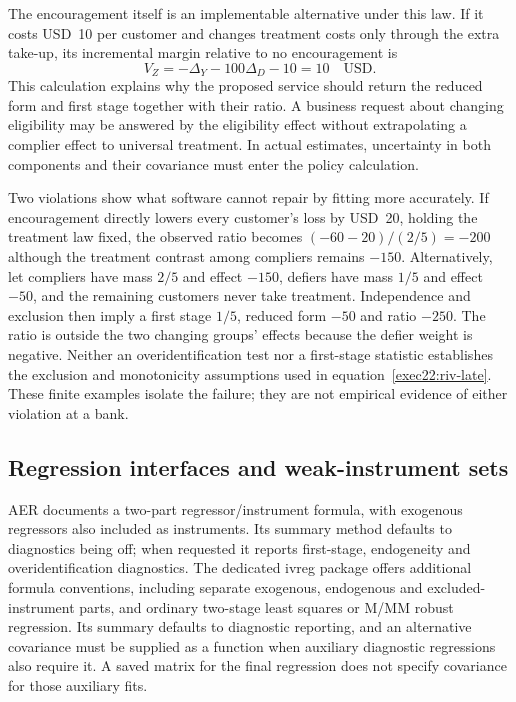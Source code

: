 The encouragement itself is an implementable alternative under this law. If it
costs USD~10 per customer and changes treatment costs only through the extra
take-up, its incremental margin relative to no encouragement is
\begin{equation}
 V_Z=-\Delta_Y-100\Delta_D-10=10\quad\text{USD}.
 \label{exec22:riv-value}
\end{equation}
This calculation explains why the proposed service should return the reduced
form and first stage together with their ratio. A business request about changing
eligibility may be answered by the eligibility effect without extrapolating a
complier effect to universal treatment. In actual estimates, uncertainty in both
components and their covariance must enter the policy calculation.

Two violations show what software cannot repair by fitting more accurately.
If encouragement directly lowers every customer's loss by USD~20, holding the
treatment law fixed, the observed ratio becomes $(-60-20)/(2/5)=-200$ although
the treatment contrast among compliers remains $-150$. Alternatively, let
compliers have mass $2/5$ and effect $-150$, defiers have mass $1/5$ and effect
$-50$, and the remaining customers never take treatment. Independence and
exclusion then imply a first stage $1/5$, reduced form $-50$ and ratio $-250$.
The ratio is outside the two changing groups' effects because the defier weight
is negative. Neither an overidentification test nor a first-stage statistic
establishes the exclusion and monotonicity assumptions used in
equation~\eqref{exec22:riv-late}. These finite examples isolate the failure;
they are not empirical evidence of either violation at a bank.

\subsection{Regression interfaces and weak-instrument sets}
\label{exec22:riv-inference}

AER documents a two-part regressor/instrument formula, with exogenous regressors
also included as instruments. Its summary method defaults to diagnostics being
off; when requested it reports first-stage, endogeneity and overidentification
diagnostics. The dedicated ivreg package offers additional formula conventions,
including separate exogenous, endogenous and excluded-instrument parts, and
ordinary two-stage least squares or M/MM robust regression. Its summary defaults
to diagnostic reporting, and an alternative covariance must be supplied as a
function when auxiliary diagnostic regressions also require it. A saved matrix
for the final regression does not specify covariance for those auxiliary fits.
\citep{exec22_riv_aer,exec22_riv_ivreg}

